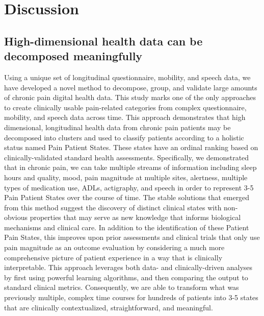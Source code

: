 \documentclass[conference]{IEEEtran}
\begin{document}
\section{Discussion}

\subsection{High-dimensional health data can be decomposed meaningfully} 

Using a unique set of longitudinal questionnaire, mobility, and speech data, we have developed a novel method to decompose, group, and validate large amounts of chronic pain digital health data. This study marks one of the only approaches to create clinically usable pain-related categories from complex questionnaire, mobility, and speech data across time. This approach demonstrates that high dimensional, longitudinal health data from chronic pain patients may be decomposed into clusters and used to classify patients according to a holistic status named Pain Patient States. These states have an ordinal ranking based on clinically-validated standard health assessments. Specifically, we demonstrated that in chronic pain, we can take multiple streams of information including sleep hours and quality, mood, pain magnitude at multiple sites, alertness, multiple types of medication use, ADLs, actigraphy, and speech in order to represent 3-5 Pain Patient States over the course of time. The stable solutions that emerged from this method suggest the discovery of distinct clinical states with non-obvious properties that may serve as new knowledge that informs biological mechanisms and clinical care. In addition to the identification of these Patient Pain States, this improves upon prior assessments and clinical trials that only use pain magnitude as an outcome evaluation by considering a much more comprehensive picture of patient experience in a way that is clinically interpretable. This approach leverages both data- and clinically-driven analyses by first using powerful learning algorithms, and then comparing the output to standard clinical metrics. Consequently, we are able to transform what was previously multiple, complex time courses for hundreds of patients into 3-5 states that are clinically contextualized, straightforward, and meaningful. 
\end{document}
